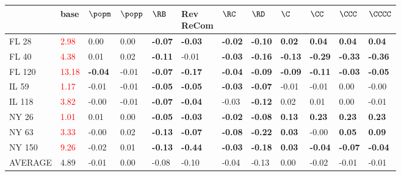 \begin{tabular}{llllllllllll}
\toprule
 & base & $\popm$ & $\popp$ & $\RB$ & \makecell{Rev \\ ReCom} & $\RC$ & $\RD$ & $\C$ & $\CC$ & $\CCC$ & $\CCCC$ \\
\midrule
FL 28 & \textcolor{red}{ 2.98 } & 0.00 & 0.00 & \textbf{-0.07} & \textbf{-0.03} & \textbf{-0.02} & \textbf{-0.10} & \textbf{0.02} & \textbf{0.04} & \textbf{0.04} & \textbf{0.04} \\
FL 40 & \textcolor{red}{ 4.38 } & 0.01 & 0.02 & \textbf{-0.11} & -0.01 & \textbf{-0.03} & \textbf{-0.16} & \textbf{-0.13} & \textbf{-0.29} & \textbf{-0.33} & \textbf{-0.36} \\
FL 120 & \textcolor{red}{ 13.18 } & \textbf{-0.04} & -0.01 & \textbf{-0.07} & \textbf{-0.17} & \textbf{-0.04} & \textbf{-0.09} & \textbf{-0.09} & \textbf{-0.11} & \textbf{-0.03} & \textbf{-0.05} \\
IL 59 & \textcolor{red}{ 1.17 } & -0.01 & -0.01 & \textbf{-0.05} & \textbf{-0.05} & \textbf{-0.03} & \textbf{-0.07} & -0.01 & -0.01 & 0.00 & -0.00 \\
IL 118 & \textcolor{red}{ 3.82 } & -0.00 & -0.01 & \textbf{-0.07} & \textbf{-0.04} & -0.03 & \textbf{-0.12} & 0.02 & 0.01 & 0.00 & -0.01 \\
NY 26 & \textcolor{red}{ 1.01 } & 0.01 & 0.00 & \textbf{-0.05} & \textbf{-0.03} & \textbf{-0.02} & \textbf{-0.08} & \textbf{0.13} & \textbf{0.23} & \textbf{0.23} & \textbf{0.23} \\
NY 63 & \textcolor{red}{ 3.33 } & -0.00 & 0.02 & \textbf{-0.13} & \textbf{-0.07} & \textbf{-0.08} & \textbf{-0.22} & \textbf{0.03} & -0.00 & \textbf{0.05} & \textbf{0.09} \\
NY 150 & \textcolor{red}{ 9.26 } & -0.02 & 0.01 & \textbf{-0.13} & \textbf{-0.44} & \textbf{-0.03} & \textbf{-0.18} & \textbf{0.03} & \textbf{-0.04} & \textbf{-0.07} & \textbf{-0.04} \\
AVERAGE & 4.89 & -0.01 & 0.00 & -0.08 & -0.10 & -0.04 & -0.13 & 0.00 & -0.02 & -0.01 & -0.01 \\
\bottomrule
\end{tabular}
